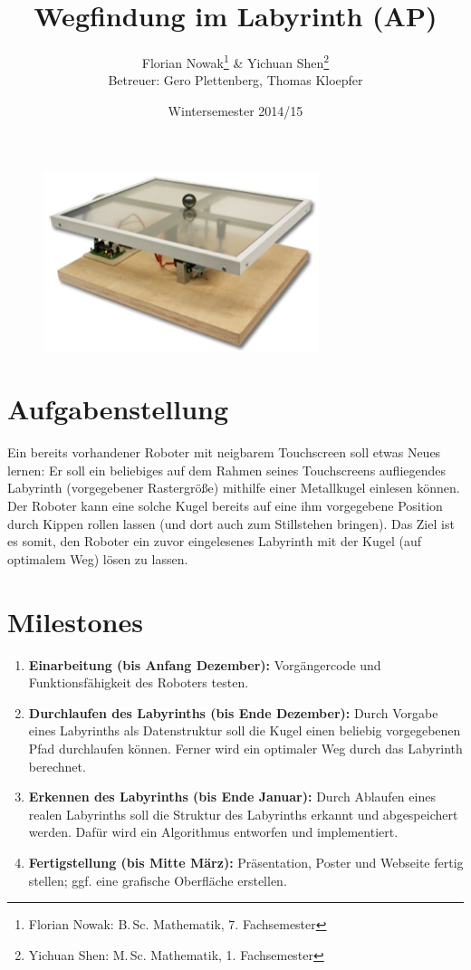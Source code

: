 \documentclass[ngerman]{scrartcl}
\title{Wegfindung im Labyrinth (AP)}
\author{
    Florian Nowak\footnote{Florian Nowak: B.\,Sc. Mathematik, 7. Fachsemester}\; \& Yichuan Shen\footnote{Yichuan Shen: M.\,Sc. Mathematik, 1. Fachsemester}\\
    Betreuer: Gero Plettenberg, Thomas Kloepfer
}
\date{Wintersemester 2014/15}
\begin{document}

\maketitle

\begin{figure}[h]
    \centering
    \includegraphics[scale=.5]{platzhalter}
\end{figure}

\section*{Aufgabenstellung}

Ein bereits vorhandener Roboter mit neigbarem Touchscreen soll etwas Neues lernen: Er soll ein beliebiges auf dem Rahmen seines Touchscreens aufliegendes Labyrinth (vorgegebener Rastergröße) mithilfe einer Metallkugel einlesen können. Der Roboter kann eine solche Kugel bereits auf eine ihm vorgegebene Position durch Kippen rollen lassen (und dort auch zum Stillstehen bringen). Das Ziel ist es somit, den Roboter ein zuvor eingelesenes Labyrinth mit der Kugel (auf optimalem Weg) lösen zu lassen.

\section*{Milestones}
\begin{enumerate}
    \item \textbf{Einarbeitung (bis Anfang Dezember):} Vorgängercode und Funktionsfähigkeit des Roboters testen.
    \item \textbf{Durchlaufen des Labyrinths (bis Ende Dezember):} Durch Vorgabe eines Labyrinths als Datenstruktur soll die Kugel einen beliebig vorgegebenen Pfad durchlaufen können. Ferner wird ein optimaler Weg durch das Labyrinth berechnet.
    \item \textbf{Erkennen des Labyrinths (bis Ende Januar):} Durch Ablaufen eines realen Labyrinths soll die Struktur des Labyrinths erkannt und abgespeichert werden. Dafür wird ein Algorithmus entworfen und implementiert.
    \item \textbf{Fertigstellung (bis Mitte März):} Präsentation, Poster und Webseite fertig stellen; ggf. eine grafische Oberfläche erstellen.
\end{enumerate}
\end{document}
